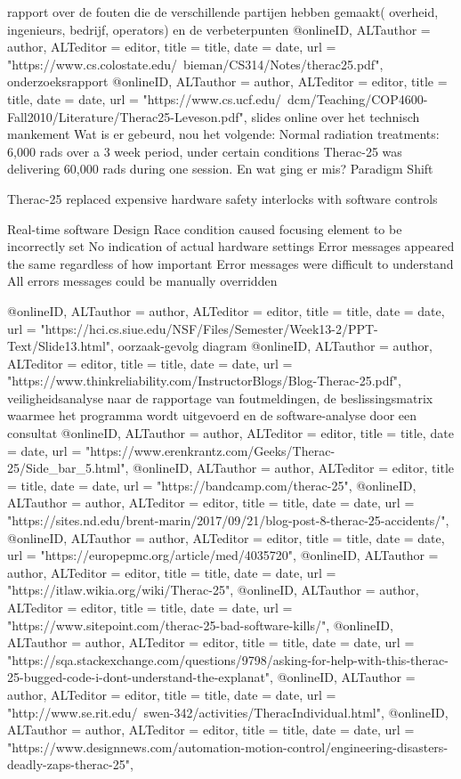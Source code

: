 {{{rapport over de fouten die de verschillende partijen hebben gemaakt( overheid, ingenieurs, bedrijf, operators) en de verbeterpunten
@online{ID,	ALTauthor = {author},	ALTeditor = {editor},	title = {title},	date = {date},	url = {"https://www.cs.colostate.edu/~bieman/CS314/Notes/therac25.pdf"},}
onderzoeksrapport
@online{ID,	ALTauthor = {author},	ALTeditor = {editor},	title = {title},	date = {date},	url = {"https://www.cs.ucf.edu/~dcm/Teaching/COP4600-Fall2010/Literature/Therac25-Leveson.pdf"},}
slides online over het technisch mankement
Wat is er gebeurd, nou het volgende:
Normal radiation treatments: 6,000 rads over a 3 week period, under certain conditions Therac-25 was delivering 60,000 rads during one session.
En wat ging er mis?
Paradigm Shift

Therac-25 replaced expensive hardware safety interlocks with software controls

Real-time software
Design
Race condition caused focusing element to be incorrectly set
No indication of actual hardware settings
Error messages appeared the same regardless of how important
Error messages were difficult to understand
All errors messages could be manually overridden

@online{ID,	ALTauthor = {author},	ALTeditor = {editor},	title = {title},	date = {date},	url = {"https://hci.cs.siue.edu/NSF/Files/Semester/Week13-2/PPT-Text/Slide13.html"},}
oorzaak-gevolg diagram
@online{ID,	ALTauthor = {author},	ALTeditor = {editor},	title = {title},	date = {date},	url = {"https://www.thinkreliability.com/InstructorBlogs/Blog-Therac-25.pdf"},}
veiligheidsanalyse naar de rapportage van foutmeldingen, de beslissingsmatrix waarmee het programma wordt uitgevoerd en de software-analyse door een consultat
@online{ID,	ALTauthor = {author},	ALTeditor = {editor},	title = {title},	date = {date},	url = {"https://www.erenkrantz.com/Geeks/Therac-25/Side_bar_5.html"},}
@online{ID,	ALTauthor = {author},	ALTeditor = {editor},	title = {title},	date = {date},	url = {"https://bandcamp.com/therac-25"},}
@online{ID,	ALTauthor = {author},	ALTeditor = {editor},	title = {title},	date = {date},	url = {"https://sites.nd.edu/brent-marin/2017/09/21/blog-post-8-therac-25-accidents/"},}
@online{ID,	ALTauthor = {author},	ALTeditor = {editor},	title = {title},	date = {date},	url = {"https://europepmc.org/article/med/4035720"},}
@online{ID,	ALTauthor = {author},	ALTeditor = {editor},	title = {title},	date = {date},	url = {"https://itlaw.wikia.org/wiki/Therac-25"},}
@online{ID,	ALTauthor = {author},	ALTeditor = {editor},	title = {title},	date = {date},	url = {"https://www.sitepoint.com/therac-25-bad-software-kills/"},}
@online{ID,	ALTauthor = {author},	ALTeditor = {editor},	title = {title},	date = {date},	url = {"https://sqa.stackexchange.com/questions/9798/asking-for-help-with-this-therac-25-bugged-code-i-dont-understand-the-explanat"},}
@online{ID,	ALTauthor = {author},	ALTeditor = {editor},	title = {title},	date = {date},	url = {"http://www.se.rit.edu/~swen-342/activities/TheracIndividual.html"},}
@online{ID,	ALTauthor = {author},	ALTeditor = {editor},	title = {title},	date = {date},	url = {"https://www.designnews.com/automation-motion-control/engineering-disasters-deadly-zaps-therac-25"},}

}}}
